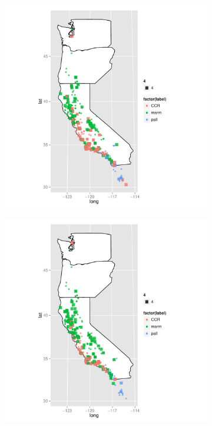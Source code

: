 \documentclass{article}\usepackage{graphicx, color}
\begin{document}
\begin{figure}[t]
  \centering
  \begin{subfigure}[b]{0.5\textwidth}
    \centering
    \caption{}
    \includegraphics[width = \textwidth]{figure/rf-map1}
    \label{fig:rf-map1}
  \end{subfigure}%
  \begin{subfigure}[b]{0.5\textwidth}
    \centering
    \caption{}
    \includegraphics[width = \textwidth]{figure/rf-map2}
    \label{fig:rf-map2}
  \end{subfigure}\\


\end{figure}
\end{document}
